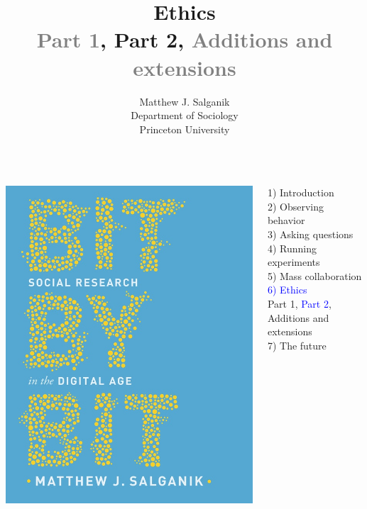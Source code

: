 \documentclass{beamer}
\title[]{Ethics\\ \textcolor{gray}{Part 1}, Part 2, \textcolor{gray}{Additions and extensions}}
\author[]{Matthew J. Salganik\\Department of Sociology\\Princeton University}
\date[]{%
\begin{flushright}
\texttt{[image: figures/cc-by.png]}
\end{flushright}
}
\begin{document}
\frame{\titlepage}
\begin{frame}

\begin{columns}
\begin{column}{.40\textwidth}
\includegraphics[width=\textwidth]{figures/salganik_bit_2018_cover}
\end{column}%

\hfill%

\begin{column}{.60\textwidth}
1) Introduction \\
2) Observing behavior \\
3) Asking questions \\
4) Running experiments \\
5) Mass collaboration \\
\textcolor{blue}{6) Ethics} \\
Part 1, \textcolor{blue}{Part 2}, Additions and extensions \\
7) The future \\
\end{column}%
\end{columns}

\end{frame}
\end{document}

